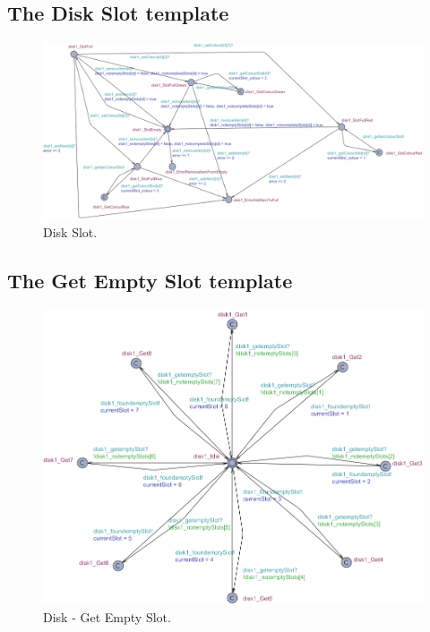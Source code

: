 \newpage
\subsection{The Disk Slot template}
\begin{figure}[H]
    \centering
    \includegraphics[width=\textwidth]{Image/uppaal-templates/disk1_DiscSlot.png}
    \caption{Disk Slot.}
    \label{fig:disk_slot}
\end{figure}

\newpage
\subsection{The Get Empty Slot template}
\begin{figure}[H]
    \centering
    \includegraphics[width=\textwidth]{Image/uppaal-templates/disk1_GetemptySlot.png}
    \caption{Disk - Get Empty Slot.}
    \label{fig:empty_slot}
\end{figure}

